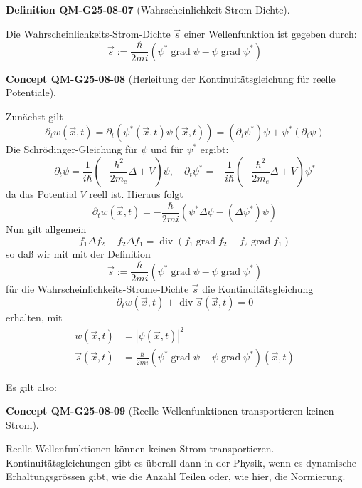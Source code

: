 \documentclass[10pt, letterpaper]{article}
\newcommand{\CustomHeading}[3]{%
  \par\medskip\noindent%
  \textbf{#1 #2} \textnormal{(#3)}.\enskip%
}
\newenvironment{DEF}[2]{\begin{unitbox}\CustomHeading{Definition}{#1}{#2}}{\end{unitbox}}
\newenvironment{CONC}[2]{\begin{unitbox}\CustomHeading{Concept}{#1}{#2}}{\end{unitbox}}
\begin{document}
\begin{DEF}{QM-G25-08-07}{Wahrscheinlichkeit-Strom-Dichte}
Die Wahrscheinlichkeits-Strom-Dichte $\vec{s}$ einer Wellenfunktion ist gegeben durch:
$$
\vec{s}:=\frac{\hbar}{2 m i}\left(\psi^{*} \operatorname{grad} \psi-\psi \operatorname{grad} \psi^{*}\right)
$$
\end{DEF}




\begin{CONC}{QM-G25-08-08}{Herleitung der Kontinuitätsgleichung für reelle Potentiale}
Zunächst gilt
$$
\partial_{t} w(\vec{x}, t)=\partial_{t}\left(\psi^{*}(\vec{x}, t) \psi(\vec{x}, t)\right)=\left(\partial_{t} \psi^{*}\right) \psi+\psi^{*}\left(\partial_{t} \psi\right)
$$
Die Schrödinger-Gleichung für $\psi$ und für $\psi^{*}$ ergibt:
$$
\partial_{t} \psi=\frac{1}{i \hbar}\left(-\frac{\hbar^{2}}{2 m_{e}} \Delta+V\right) \psi, \quad \partial_{t} \psi^{*}=-\frac{1}{i \hbar}\left(-\frac{\hbar^{2}}{2 m_{e}} \Delta+V\right) \psi^{*}
$$
da das Potential $V$ reell ist. Hieraus folgt
$$
\partial_{t} w(\vec{x}, t)=-\frac{\hbar}{2 m i}\left(\psi^{*} \Delta \psi-\left(\Delta \psi^{*}\right) \psi\right)
$$
Nun gilt allgemein
$$
f_{1} \Delta f_{2}-f_{2} \Delta f_{1}=\operatorname{div}\left(f_{1} \operatorname{grad} f_{2}-f_{2} \operatorname{grad} f_{1}\right)
$$
so daß wir mit mit der Definition
$$
\vec{s}:=\frac{\hbar}{2 m i}\left(\psi^{*} \operatorname{grad} \psi-\psi \operatorname{grad} \psi^{*}\right)
$$
für die Wahrscheinlichkeits-Strome-Dichte $\vec{s}$ die Kontinuitätsgleichung
$$
\partial_{t} w(\vec{x}, t)+\operatorname{div} \vec{s}(\vec{x}, t)=0
$$
erhalten, mit
$$
\begin{aligned}
w(\vec{x}, t) & =|\psi(\vec{x}, t)|^{2} \\
\vec{s}(\vec{x}, t) & =\frac{\hbar}{2 m i}\left(\psi^{*} \operatorname{grad} \psi-\psi \operatorname{grad} \psi^{*}\right)(\vec{x}, t)
\end{aligned}
$$
\end{CONC}

Es gilt also:



\begin{CONC}{QM-G25-08-09}{Reelle Wellenfunktionen transportieren keinen Strom}
Reelle Wellenfunktionen können keinen Strom transportieren. Kontinuitätsgleichungen gibt es überall dann in der Physik, wenn es dynamische Erhaltungsgrössen gibt, wie die Anzahl Teilen oder, wie hier, die Normierung.
\end{CONC}
\end{document}
